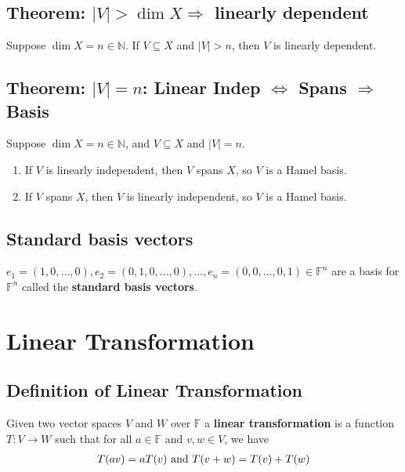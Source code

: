 \documentclass[11pt]{elegantbook}
\begin{document}
\subsection{Theorem: $|V|>\dim X \Rightarrow$ linearly dependent}
\begin{theorem}
    Suppose $\dim X = n \in \mathbb{N}$. If $V \subseteq X$ and $|V| > n$, then $V$ is linearly dependent.
\end{theorem}

\subsection{Theorem: $|V|=n$: Linear Indep $\Leftrightarrow$ Spans $\Rightarrow$ Basis}
\begin{theorem}[$|V|=n$: Linear Indep $\Leftrightarrow$ Spans $\Rightarrow$ Basis]
    Suppose $\dim X = n \in \mathbb{N}$, and $V \subseteq X$ and $|V| = n$.
    \begin{enumerate}
        \item If $V$ is linearly independent, then $V$ spans $X$, so $V$ is a Hamel basis.
        \item If $V$ spans $X$, then $V$ is linearly independent, so $V$ is a Hamel basis.
    \end{enumerate}
\end{theorem}





\subsection{Standard basis vectors}
$e_1=(1,0,...,0),e_2=(0,1,0,...,0),...,e_n=(0,0,...,0,1)\in \mathbb{F}^n$ are a basis for $\mathbb{F}^n$ called the \textbf{standard basis vectors}.


\section{Linear Transformation}
\subsection{Definition of Linear Transformation}
\begin{definition}
    \normalfont
    Given two vector spaces $V$ and $W$ over $\mathbb{F}$ a \textbf{linear transformation} is a function $T : V \rightarrow	 W$ such that
for all $a \in \mathbb{F}$ and $v,w \in V$, we have
\begin{equation}
    \begin{aligned}
        T(av)=aT(v) \textnormal{ and } T(v+w)=T(v)+T(w)
    \end{aligned}
    \nonumber
\end{equation}
\end{definition}
\end{document}
